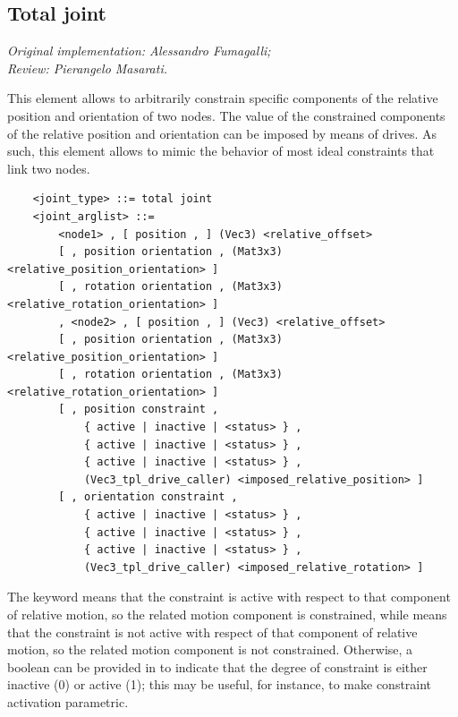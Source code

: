 \subsection{Total joint}
\label{sec:EL:STRUCT:JOINT:TOTAL_JOINT}
\emph{Original implementation: Alessandro Fumagalli; \\
Review: Pierangelo Masarati.}

This element allows to arbitrarily constrain specific components
of the relative position and orientation of two nodes.
The value of the constrained components of the relative position
and orientation can be imposed by means of drives.
As such, this element allows to mimic the behavior of most
ideal constraints that link two nodes.
\begin{verbatim}
    <joint_type> ::= total joint
    <joint_arglist> ::=
        <node1> , [ position , ] (Vec3) <relative_offset>
        [ , position orientation , (Mat3x3) <relative_position_orientation> ]
        [ , rotation orientation , (Mat3x3) <relative_rotation_orientation> ]
        , <node2> , [ position , ] (Vec3) <relative_offset>
        [ , position orientation , (Mat3x3) <relative_position_orientation> ]
        [ , rotation orientation , (Mat3x3) <relative_rotation_orientation> ]
        [ , position constraint ,
            { active | inactive | <status> } ,
            { active | inactive | <status> } ,
            { active | inactive | <status> } ,
            (Vec3_tpl_drive_caller) <imposed_relative_position> ]
        [ , orientation constraint ,
            { active | inactive | <status> } ,
            { active | inactive | <status> } ,
            { active | inactive | <status> } ,
            (Vec3_tpl_drive_caller) <imposed_relative_rotation> ]
\end{verbatim}
The keyword  means that the constraint is active
with respect to that component of relative motion,
so the related motion component is constrained,
while  means that the constraint is not active
with respect of that component of relative motion,
so the related motion component is not constrained.
Otherwise, a boolean can be provided in  to indicate
that the degree of constraint is either inactive (0) or active (1);
this may be useful, for instance, to make constraint activation
parametric.

